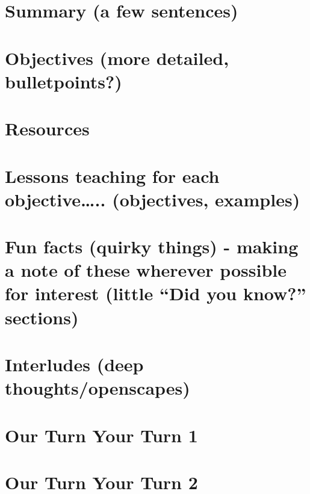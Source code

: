 \documentclass[]{book}
\begin{document}
\hypertarget{summary-a-few-sentences-2}{%
\section{Summary (a few sentences)}\label{summary-a-few-sentences-2}}

\hypertarget{objectives-more-detailed-bulletpoints-2}{%
\section{Objectives (more detailed, bulletpoints?)}\label{objectives-more-detailed-bulletpoints-2}}

\hypertarget{resources-2}{%
\section{Resources}\label{resources-2}}

\hypertarget{lessons-teaching-for-each-objective..-objectives-examples-1}{%
\section{Lessons teaching for each objective\ldots{}.. (objectives, examples)}\label{lessons-teaching-for-each-objective..-objectives-examples-1}}

\hypertarget{fun-facts-quirky-things---making-a-note-of-these-wherever-possible-for-interest-little-did-you-know-sections-1}{%
\section{Fun facts (quirky things) - making a note of these wherever possible for interest (little ``Did you know?'' sections)}\label{fun-facts-quirky-things---making-a-note-of-these-wherever-possible-for-interest-little-did-you-know-sections-1}}

\hypertarget{interludes-deep-thoughtsopenscapes-2}{%
\section{Interludes (deep thoughts/openscapes)}\label{interludes-deep-thoughtsopenscapes-2}}

\hypertarget{our-turn-your-turn-1-2}{%
\section{Our Turn Your Turn 1}\label{our-turn-your-turn-1-2}}

\hypertarget{our-turn-your-turn-2-2}{%
\section{Our Turn Your Turn 2}\label{our-turn-your-turn-2-2}}
\end{document}
